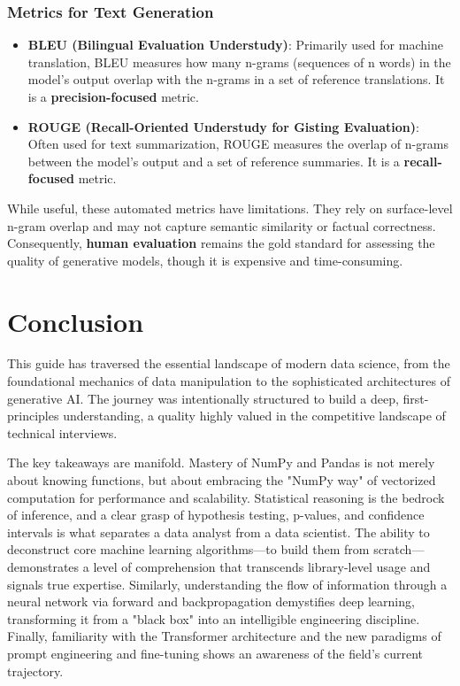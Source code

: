\documentclass[11pt,a4paper]{article}
\begin{document}
\subsubsection{Metrics for Text Generation}
\begin{itemize}
    \item \textbf{BLEU (Bilingual Evaluation Understudy)}: Primarily used for machine translation, BLEU measures how many n-grams (sequences of n words) in the model's output overlap with the n-grams in a set of reference translations. It is a \textbf{precision-focused} metric.
    \item \textbf{ROUGE (Recall-Oriented Understudy for Gisting Evaluation)}: Often used for text summarization, ROUGE measures the overlap of n-grams between the model's output and a set of reference summaries. It is a \textbf{recall-focused} metric.
\end{itemize}

While useful, these automated metrics have limitations. They rely on surface-level n-gram overlap and may not capture semantic similarity or factual correctness. Consequently, \textbf{human evaluation} remains the gold standard for assessing the quality of generative models, though it is expensive and time-consuming.

\section*{Conclusion}

This guide has traversed the essential landscape of modern data science, from the foundational mechanics of data manipulation to the sophisticated architectures of generative AI. The journey was intentionally structured to build a deep, first-principles understanding, a quality highly valued in the competitive landscape of technical interviews.

The key takeaways are manifold. Mastery of NumPy and Pandas is not merely about knowing functions, but about embracing the "NumPy way" of vectorized computation for performance and scalability. Statistical reasoning is the bedrock of inference, and a clear grasp of hypothesis testing, p-values, and confidence intervals is what separates a data analyst from a data scientist. The ability to deconstruct core machine learning algorithms—to build them from scratch—demonstrates a level of comprehension that transcends library-level usage and signals true expertise. Similarly, understanding the flow of information through a neural network via forward and backpropagation demystifies deep learning, transforming it from a "black box" into an intelligible engineering discipline. Finally, familiarity with the Transformer architecture and the new paradigms of prompt engineering and fine-tuning shows an awareness of the field's current trajectory.
\end{document}
